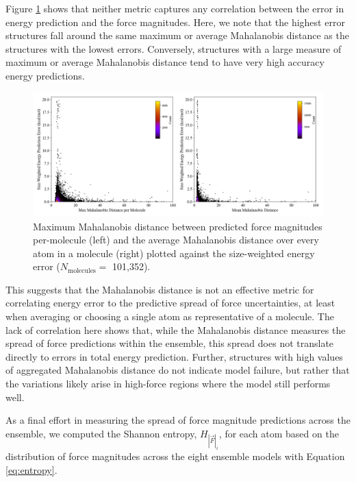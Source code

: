 Figure \ref{fig:mahalanobis} shows that neither metric captures any correlation between the error in energy prediction and the force magnitudes.
Here, we note that the highest error structures fall around the same maximum or average Mahalanobis distance as the structures with the lowest errors.
Conversely, structures with a large measure of maximum or average Mahalanobis distance tend to have very high accuracy energy predictions.

\begin{figure}[!h]
    \centering
    \includegraphics[width=1\linewidth]{Images/2xr_forces/2xr_comp6v1_mahalanobis-uncertainty-vs-energy.png}
    \caption[Mahalanobis distance between ensemble predictions of force magnitude (COMP6v1)]{Maximum Mahalanobis distance between predicted force magnitudes per-molecule (left) and the average Mahalanobis distance over every atom in a molecule (right) plotted against the size-weighted energy error ($N_\text{molecules}=$ 101,352).}
    \label{fig:mahalanobis}
\end{figure}

This suggests that the Mahalanobis distance is not an effective metric for correlating energy error to the predictive spread of force uncertainties, at least when averaging or choosing a single atom as representative of a molecule.
The lack of correlation here shows that, while the Mahalanobis distance measures the spread of force predictions within the ensemble, this spread does not translate directly to errors in total energy prediction.
Further, structures with high values of aggregated Mahalanobis distance do not indicate model failure, but rather that the variations likely arise in high-force regions where the model still performs well.

As a final effort in measuring the spread of force magnitude predictions across the ensemble, we computed the Shannon entropy, $H_{|\vec{F}|_i}$,  for each atom based on the distribution of force magnitudes across the eight ensemble models with Equation \ref{eq:entropy}.

